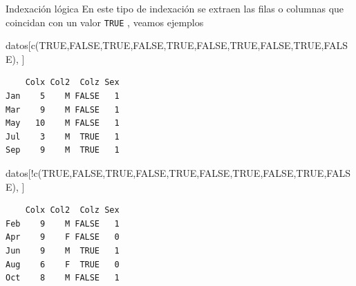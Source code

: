 \documentclass[
  ignorenonframetext,
  aspectratio=169,
  spanish,
]{beamer}
\newenvironment{Shaded}{\begin{snugshade}}{\end{snugshade}}
\newcommand{\ConstantTok}[1]{\textcolor[rgb]{0.56,0.35,0.01}{#1}}
\newcommand{\FunctionTok}[1]{\textcolor[rgb]{0.28,0.35,0.67}{#1}}
\newcommand{\NormalTok}[1]{\textcolor[rgb]{0.00,0.23,0.31}{#1}}
\newcommand{\SpecialCharTok}[1]{\textcolor[rgb]{0.37,0.37,0.37}{#1}}
\begin{document}
\begin{frame}[fragile]{Indexación lógica}
\label{indexaciuxf3n-luxf3gica}
En este tipo de indexación se extraen las filas o columnas que coincidan
con un valor \texttt{TRUE} , veamos ejemplos

\begin{Shaded}
\begin{Highlighting}[]
\NormalTok{datos[}\FunctionTok{c}\NormalTok{(}\ConstantTok{TRUE}\NormalTok{,}\ConstantTok{FALSE}\NormalTok{,}\ConstantTok{TRUE}\NormalTok{,}\ConstantTok{FALSE}\NormalTok{,}\ConstantTok{TRUE}\NormalTok{,}\ConstantTok{FALSE}\NormalTok{,}\ConstantTok{TRUE}\NormalTok{,}\ConstantTok{FALSE}\NormalTok{,}\ConstantTok{TRUE}\NormalTok{,}\ConstantTok{FALSE}\NormalTok{), ]  }
\end{Highlighting}
\end{Shaded}

\begin{verbatim}
    Colx Col2  Colz Sex
Jan    5    M FALSE   1
Mar    9    M FALSE   1
May   10    M FALSE   1
Jul    3    M  TRUE   1
Sep    9    M  TRUE   1
\end{verbatim}

\begin{Shaded}
\begin{Highlighting}[]
\NormalTok{datos[}\SpecialCharTok{!}\FunctionTok{c}\NormalTok{(}\ConstantTok{TRUE}\NormalTok{,}\ConstantTok{FALSE}\NormalTok{,}\ConstantTok{TRUE}\NormalTok{,}\ConstantTok{FALSE}\NormalTok{,}\ConstantTok{TRUE}\NormalTok{,}\ConstantTok{FALSE}\NormalTok{,}\ConstantTok{TRUE}\NormalTok{,}\ConstantTok{FALSE}\NormalTok{,}\ConstantTok{TRUE}\NormalTok{,}\ConstantTok{FALSE}\NormalTok{), ]  }
\end{Highlighting}
\end{Shaded}

\begin{verbatim}
    Colx Col2  Colz Sex
Feb    9    M FALSE   1
Apr    9    F FALSE   0
Jun    9    M  TRUE   1
Aug    6    F  TRUE   0
Oct    8    M FALSE   1
\end{verbatim}
\end{frame}
\end{document}
